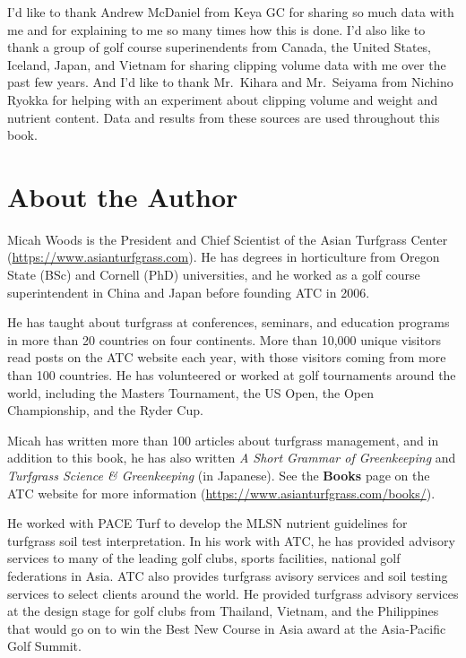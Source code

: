 \documentclass[12pt,b5,]{tufte-book}
\begin{document}
I'd like to thank Andrew McDaniel from Keya GC for sharing so much data with me and for explaining to me so many times how this is done. I'd also like to thank a group of golf course superinendents from Canada, the United States, Iceland, Japan, and Vietnam for sharing clipping volume data with me over the past few years. And I'd like to thank Mr.~Kihara and Mr.~Seiyama from Nichino Ryokka for helping with an experiment about clipping volume and weight and nutrient content. Data and results from these sources are used throughout this book.

\hypertarget{about-the-author}{%
\chapter*{About the Author}\label{about-the-author}}

Micah Woods is the President and Chief Scientist of the Asian Turfgrass Center (\url{https://www.asianturfgrass.com}). He has degrees in horticulture from Oregon State (BSc) and Cornell (PhD) universities, and he worked as a golf course superintendent in China and Japan before founding ATC in 2006.

He has taught about turfgrass at conferences, seminars, and education programs in more than 20 countries on four continents. More than 10,000 unique visitors read posts on the ATC website each year, with those visitors coming from more than 100 countries. He has volunteered or worked at golf tournaments around the world, including the Masters Tournament, the US Open, the Open Championship, and the Ryder Cup.

Micah has written more than 100 articles about turfgrass management, and in addition to this book, he has also written \emph{A Short Grammar of Greenkeeping} and \emph{Turfgrass Science \& Greenkeeping} (in Japanese). See the \textbf{Books} page on the ATC website for more information (\url{https://www.asianturfgrass.com/books/}).

He worked with PACE Turf to develop the MLSN nutrient guidelines for turfgrass soil test interpretation. In his work with ATC, he has provided advisory services to many of the leading golf clubs, sports facilities, national golf federations in Asia. ATC also provides turfgrass avisory services and soil testing services to select clients around the world. He provided turfgrass advisory services at the design stage for golf clubs from Thailand, Vietnam, and the Philippines that would go on to win the Best New Course in Asia award at the Asia-Pacific Golf Summit.
\end{document}
